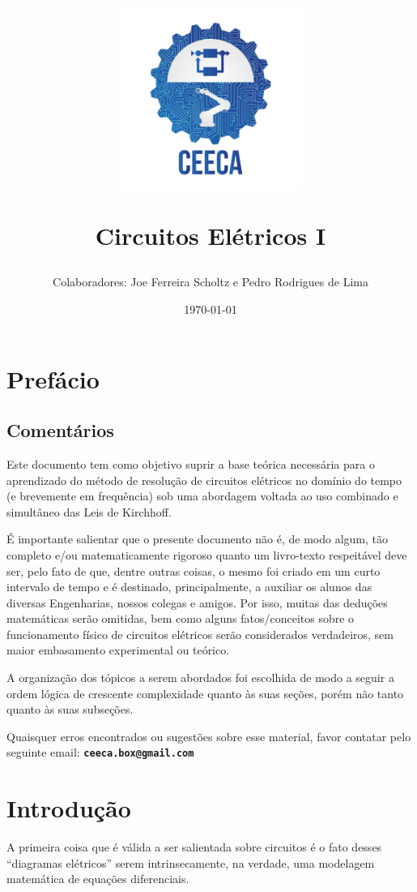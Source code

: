 \documentclass{article}
\title{\begin{center}
    \includegraphics[width=0.45\textwidth]{img/ceeca.png}
\end{center}
\vspace{2mm}
\textbf{Circuitos Elétricos I}}
\author{Colaboradores: Joe Ferreira Scholtz e Pedro Rodrigues de Lima}
\date{\today}
\numberwithin{equation}{section}
\begin{document}
\maketitle

\newpage
\tableofcontents
\newpage

\section{Prefácio}
\label{sec:pref}

\subsection{Comentários}
\label{subsec:coment}

Este documento tem como objetivo suprir a base teórica necessária para o aprendizado do método de resolução de circuitos elétricos no domínio do tempo (e brevemente em frequência) sob uma abordagem voltada ao uso combinado e simultâneo das Leis de Kirchhoff.

É importante salientar que o presente documento não é, de modo algum, tão completo e/ou matematicamente rigoroso quanto um livro-texto respeitável deve ser, pelo fato de que, dentre outras coisas, o mesmo foi criado em um curto intervalo de tempo e é destinado, principalmente, a auxiliar os alunos das diversas Engenharias, nossos colegas e amigos. Por isso, muitas das deduções matemáticas serão omitidas, bem como alguns fatos/conceitos sobre o funcionamento físico de circuitos elétricos serão considerados verdadeiros, sem maior embasamento experimental ou teórico.

A organização dos tópicos a serem abordados foi escolhida de modo a seguir a ordem lógica de crescente complexidade quanto às suas seções, porém não tanto quanto às suas subseções.

Quaisquer erros encontrados ou sugestões sobre esse material, favor contatar pelo seguinte email: \textbf{\texttt{ceeca.box@gmail.com}}

\newpage

\section{Introdução}
\label{sec:introd}

A primeira coisa que é válida a ser salientada sobre circuitos é o fato desses ``diagramas elétricos''  serem intrinsecamente, na verdade, uma modelagem matemática de equações diferenciais.
\end{document}
